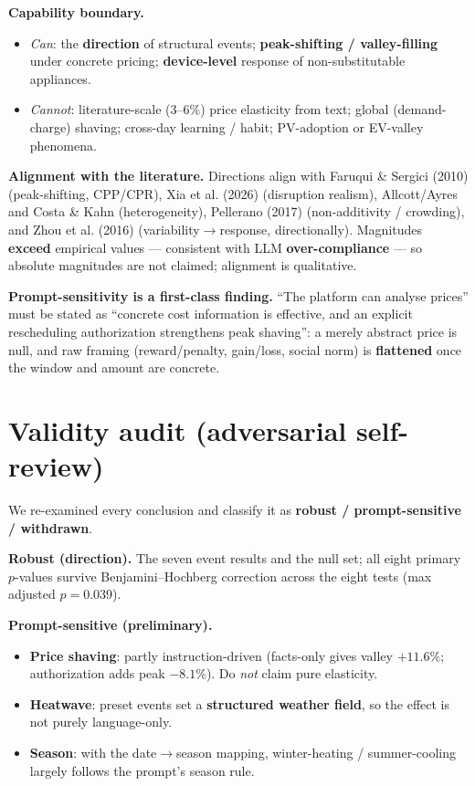 \documentclass[11pt]{article}
\begin{document}
\noindent\textbf{Capability boundary.}
\begin{itemize}
\item \emph{Can}: the \textbf{direction} of structural events; \textbf{peak-shifting / valley-filling}
under concrete pricing; \textbf{device-level} response of non-substitutable appliances.
\item \emph{Cannot}: literature-scale (3--6\%) price elasticity from text; global (demand-charge) shaving;
cross-day learning / habit; PV-adoption or EV-valley phenomena.
\end{itemize}

\noindent\textbf{Alignment with the literature.} Directions align with Faruqui \& Sergici (2010)
(peak-shifting, CPP/CPR), Xia et al. (2026) (disruption realism), Allcott/Ayres and Costa \& Kahn
(heterogeneity), Pellerano (2017) (non-additivity / crowding), and Zhou et al. (2016)
(variability$\rightarrow$response, directionally). Magnitudes \textbf{exceed} empirical values --- consistent
with LLM \textbf{over-compliance} --- so absolute magnitudes are not claimed; alignment is qualitative.

\noindent\textbf{Prompt-sensitivity is a first-class finding.} ``The platform can analyse prices'' must be
stated as ``concrete cost information is effective, and an explicit rescheduling authorization strengthens
peak shaving'': a merely abstract price is null, and raw framing (reward/penalty, gain/loss, social norm)
is \textbf{flattened} once the window and amount are concrete.

\section{Validity audit (adversarial self-review)}
\label{sec:audit}
We re-examined every conclusion and classify it as \textbf{robust / prompt-sensitive / withdrawn}.

\noindent\textbf{Robust (direction).} The seven event results and the null set; all eight primary $p$-values
survive Benjamini--Hochberg correction across the eight tests (max adjusted $p=0.039$).

\noindent\textbf{Prompt-sensitive (preliminary).}
\begin{itemize}
\item \textbf{Price shaving}: partly instruction-driven (facts-only gives valley $+11.6\%$; authorization
adds peak $-8.1\%$). Do \emph{not} claim pure elasticity.
\item \textbf{Heatwave}: preset events set a \textbf{structured weather field}, so the effect is not
purely language-only.
\item \textbf{Season}: with the date$\rightarrow$season mapping, winter-heating / summer-cooling largely
follows the prompt's season rule.
\end{itemize}
\end{document}
